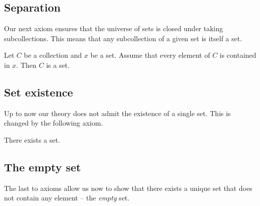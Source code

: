 \documentclass[../../set-theory.ftl.tex]{subfiles}
\begin{document}
  \subsection{Separation}

  \noindent Our next axiom ensures that the universe of sets is closed under
  taking subcollections.
  This means that any subcollection of a given set is itself a set.

  \begin{forthel}
    \begin{axiom}[Separation]\label{SetTheory_01_01_240572}
      Let $C$ be a collection and $x$ be a set.
      Assume that every element of $C$ is contained in $x$.
      Then $C$ is a set.
    \end{axiom}
  \end{forthel}


  \subsection{Set existence}

  \noindent Up to now our theory does not admit the existence of a single set.
  This is changed by the following axiom.

  \begin{forthel}
    \begin{axiom}\label{SetTheory_01_01_559689}
      There exists a set.
    \end{axiom}
  \end{forthel}


  \subsection{The empty set}

  \noindent The last to axioms allow us now to show that there exists a unique
  set that does not contain any element -- the \textit{empty} set.
\end{document}

